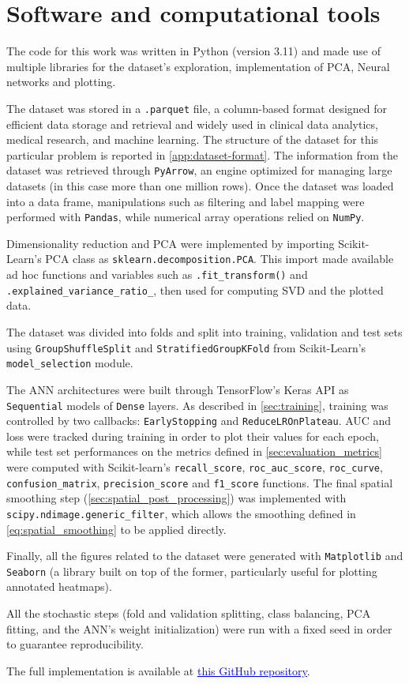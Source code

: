 \section{Software and computational tools}
\label{sec:software_tools}

The code for this work was written in Python (version 3.11) and made use of multiple libraries for the dataset's exploration, implementation of PCA, Neural networks and plotting.

The dataset was stored in a \texttt{.parquet} file, a column-based format designed for efficient data storage and retrieval and widely used in clinical data analytics, medical research, and machine learning. The structure of the dataset for this particular problem is reported in \cref{app:dataset-format}. The information from the dataset was retrieved through \texttt{PyArrow}, an engine optimized for managing large datasets (in this case more than one million rows). Once the dataset was loaded into a data frame, manipulations such as filtering and label mapping were performed with \texttt{Pandas}, while numerical array operations relied on \texttt{NumPy}.

Dimensionality reduction and PCA were implemented by importing Scikit-Learn's PCA class as \texttt{sklearn.decomposition.PCA}. This import made available ad hoc functions and variables such as \texttt{.fit\_transform()} and \texttt{.explained\_variance\_ratio\_}, then used for computing SVD and the plotted data.

The dataset was divided into folds and split into training, validation and test sets using \texttt{GroupShuffleSplit} and \texttt{StratifiedGroupKFold} from Scikit-Learn's \texttt{model\_selection} module.

The ANN architectures were built through TensorFlow's Keras API as \texttt{Sequential} models of \texttt{Dense} layers. As described in \cref{sec:training}, training was controlled by two callbacks: \texttt{EarlyStopping} and \texttt{ReduceLROnPlateau}. AUC and loss were tracked during training in order to plot their values for each epoch, while test set performances on the metrics defined in \cref{sec:evaluation_metrics} were computed with Scikit-learn's \texttt{recall\_score}, \texttt{roc\_auc\_score}, \texttt{roc\_curve}, \texttt{confusion\_matrix}, \texttt{precision\_score} and \texttt{f1\_score} functions.
The final spatial smoothing step (\cref{sec:spatial_post_processing}) was implemented with \texttt{scipy.ndimage.generic\_filter}, which allows the smoothing defined in \cref{eq:spatial_smoothing} to be applied directly.

Finally, all the figures related to the dataset were generated with \texttt{Matplotlib} and \texttt{Seaborn} (a library built on top of the former, particularly useful for plotting annotated heatmaps).

All the stochastic steps (fold and validation splitting, class balancing, PCA fitting, and the ANN's weight initialization) were run with a fixed seed in order to guarantee reproducibility.

The full implementation is available at \href{https://github.com/claudiocaaruso/VibraAI}{\textcolor{blue}{\underline{this GitHub repository}}}.
